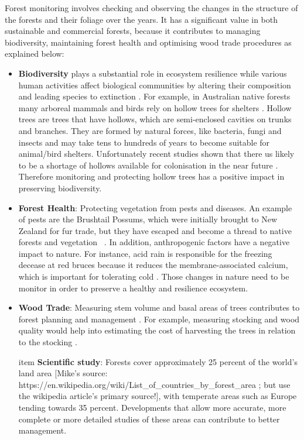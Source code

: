 \documentclass{subfiles}
\begin{document}
Forest monitoring {\color{blue} involves checking and observing the changes in the structure of the forests and their foliage over the years. It has a significant value in both sustainable and commercial forests, because it contributes} to managing biodiversity, maintaining forest health and optimising wood trade procedures as explained below: 
\begin{itemize}
 \item \textbf{Biodiversity} plays a substantial role in ecosystem resilience \cite{Elmqvist2003} while various human activities affect biological communities by altering their composition and leading species to extinction \cite{Hooper2005}.  For example, in Australian native forests many arboreal mammals and birds rely on hollow trees for shelters \cite{Lindenmayer2010} {\color{blue}. Hollow trees are trees that have hollows, which are semi-enclosed cavities on trunks and branches. They are formed by natural forces, like bacteria, fungi and insects and may take tens to hundreds of years to become suitable for animal/bird shelters. Unfortunately recent studies shown that there us likely to be a shortage of hollows available for colonisation in the near future \cite{Goldingay2009}\cite{Gibbons2002}}. Therefore monitoring and protecting hollow trees has a positive impact in preserving biodiversity.
 
 \item \textbf{Forest Health}: Protecting vegetation from pests and diseases. An example of pests are the Brushtail Possums, which were initially brought to New Zealand for fur trade, but they have escaped and become a thread to native forests and vegetation ~\cite{DepartementOfConversation2014}. In addition, anthropogenic factors have a negative impact to nature. For instance, acid rain is responsible for the freezing decease at red bruces because it reduces the membrane-associated calcium, which is important for tolerating cold 
 \cite{DeHayes1999}. Those changes in nature need to be monitor in order to preserve a healthy and resilience ecosystem. 
 
 \item \textbf{Wood Trade}:  Measuring stem volume and basal areas of trees contributes to forest planning and management \cite{Holmgren2004}. For example, measuring stocking and wood quality would help into estimating the cost of harvesting the trees in relation to the stocking \cite{Susana2015}.

 {\color{Fuchsia} item \textbf{Scientific study}: Forests cover approximately 25 percent of the world's land area [Mike's source: https://en.wikipedia.org/wiki/List\_of\_countries\_by\_forest\_area ; but use the wikipedia article's primary source!], with temperate areas such as Europe tending towards 35 percent.  Developments that allow more accurate, more complete or more detailed studies of these areas can contribute to better management.}

\end{itemize}
 
\end{document}
